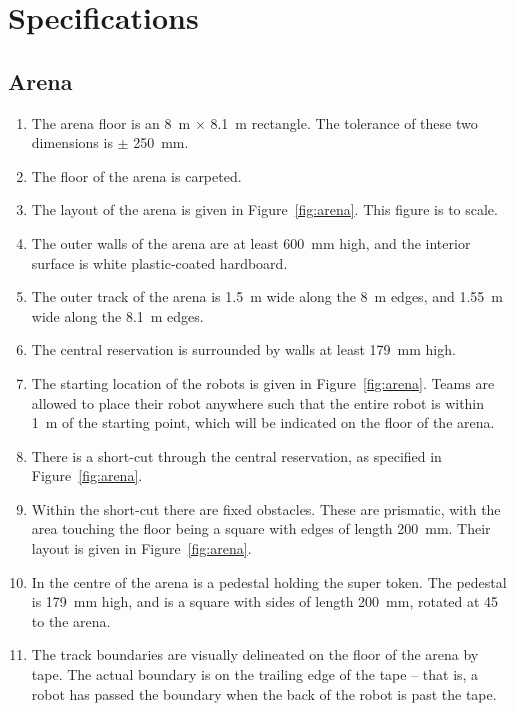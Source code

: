 \section{Specifications}
\label{sec:specs}

\subsection{Arena}
\label{spec:arena}

\begin{enumerate}
  \item The arena floor is an \SI{8}{m} $\times$ \SI{8.1}{m} rectangle. The
        tolerance of these two dimensions is $\pm$ \SI{250}{mm}.
  \item The floor of the arena is carpeted.
  \item The layout of the arena is given in Figure~\ref{fig:arena}. This
        figure is to scale.
  \item The outer walls of the arena are at least \SI{600}{mm} high, and the
        interior surface is white plastic-coated hardboard.
  \item The outer track of the arena is \SI{1.5}{m} wide along the \SI{8}{m}
        edges, and \SI{1.55}{m} wide along the \SI{8.1}{m} edges.
  \item The central reservation is surrounded by walls at least \SI{179}{mm}
        high.
  \item The starting location of the robots is given in Figure~\ref{fig:arena}.
        Teams are allowed to place their robot anywhere such that the entire
        robot is within \SI{1}{m} of the starting point, which will be
        indicated on the floor of the arena.
  \item There is a short-cut through the central reservation, as specified in
        Figure~\ref{fig:arena}.
  \item Within the short-cut there are fixed obstacles. These are prismatic,
        with the area touching the floor being a square with edges of length
        \SI{200}{mm}. Their layout is given in Figure~\ref{fig:arena}.
  \item In the centre of the arena is a pedestal holding the super token. The
        pedestal is \SI{179}{mm} high, and is a square with sides of length
        \SI{200}{mm}, rotated at 45\degree{} to the arena.
  \item The track boundaries are visually delineated on the floor of the arena
        by tape. The actual boundary is on the trailing edge of the tape --
        that is, a robot has passed the boundary when the back of the robot
        is past the tape.
\end{enumerate}

